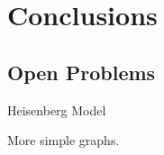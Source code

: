 \documentclass[../thesis-main/thesis-main]{subfiles}
\begin{document}
\chapter{Conclusions}

\section{Open Problems}

Heisenberg Model

More simple graphs.
\end{document}
